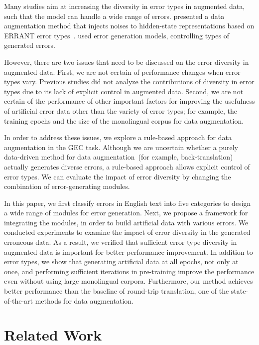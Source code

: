 \documentclass[11pt]{article}
\begin{document}
Many studies aim at increasing the diversity in error types in augmented data, such that the model can handle a wide range of errors.
\citet{wan-etal-2020-improving} presented a data augmentation method that injects noises to hidden-state representations based on ERRANT error types~\citep{bryant-etal-2017-automatic}.
\citet{stahlberg-kumar-2021-synthetic} used error generation models, controlling types of generated errors.

However, there are two issues that need to be discussed on the error diversity in augmented data.
First, we are not certain of performance changes when error types vary.
Previous studies did not analyze the contributions of diversity in error types due to its lack of explicit control in augmented data.
Second, we are not certain of the performance of other important factors for improving the usefulness of artificial error data other than the variety of error types;
for example, the training epochs and the size of the monolingual corpus for data augmentation.

In order to address these issues, we explore a rule-based approach for data augmentation in the GEC task.
Although we are uncertain whether a purely data-driven method for data augmentation~(for example, back-translation) actually generates diverse errors,
a rule-based approach allows explicit control of error types.
We can evaluate the impact of error diversity by changing the combination of error-generating modules.

In this paper, we first classify errors in English text into five categories to design a wide range of modules for error generation.
Next, we propose a framework for integrating the modules, in order to build artificial data with various errors. 
We conducted experiments to examine the impact of error diversity in the generated erroneous data.
As a result, we verified that sufficient error type diversity in augmented data is important for better performance improvement.
In addition to error types, we show that generating artificial data at all epochs, not only at once,
and performing sufficient iterations in pre-training improve the performance even without using large monolingual corpora.
Furthermore, our method achieves better performance than the baseline of round-trip translation,
one of the state-of-the-art methods for data augmentation.

\section{Related Work}
\label{sec:related}
\end{document}
